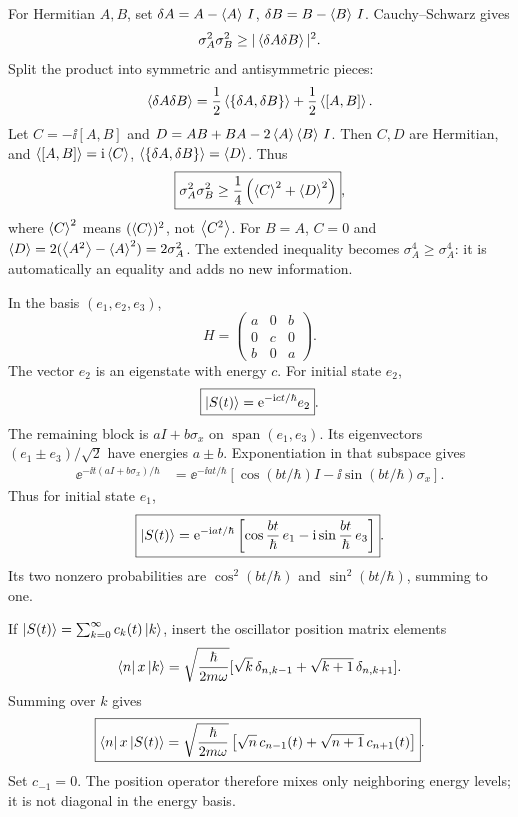 For Hermitian $A,B$, set
$\delta A=A-\left\langle A\right\rangle\,I$,
$\delta B=B-\left\langle B\right\rangle\,I$.
Cauchy--Schwarz gives
\begin{equation}
\sigma_A^2\sigma_B^2\ge
|\left\langle\delta A\delta B\right\rangle|^2.
\end{equation}
Split the product into symmetric
and antisymmetric pieces:
\begin{equation}
\left\langle\delta A\delta B\right\rangle=
\frac12\left\langle\{\delta A,\delta B\}\right\rangle+
\frac12\left\langle[A,B]\right\rangle.
\end{equation}
Let $C=-\ii[A,B]$ and
$D=AB+BA-2\left\langle A\right\rangle\left\langle B\right\rangle\,I$.
Then $C,D$ are Hermitian, and
$\left\langle[A,B]\right\rangle=\mathrm{i}\left\langle C\right\rangle$,
$\left\langle\{\delta A,\delta B\}\right\rangle=\left\langle D\right\rangle$.
Thus
\begin{equation}
\boxed{\sigma_A^2\sigma_B^2\ge
\frac14\left(\left\langle C\right\rangle^2+\left\langle D\right\rangle^2\right)},
\end{equation}
where $\left\langle C\right\rangle^2$ means
$(\left\langle C\right\rangle)^2$, not $\left\langle C^2\right\rangle$.
For $B=A$, $C=0$ and
$\left\langle D\right\rangle=2(\left\langle A^2\right\rangle-\left\langle A\right\rangle^2)=2\sigma_A^2$.
The extended inequality becomes
$\sigma_A^4\ge\sigma_A^4$:
it is automatically an equality and
adds no new information.

In the basis $(e_1,e_2,e_3)$,
\begin{equation}
H=\begin{pmatrix}a&0&b\\0&c&0\\b&0&a\end{pmatrix}.
\end{equation}
The vector $e_2$ is an eigenstate
with energy $c$. For initial state $e_2$,
\begin{equation}
\boxed{\left|S(t)\right\rangle=\mathrm{e}^{-\mathrm{i} ct/\hbar}e_2}.
\end{equation}
The remaining block is
$aI+b\sigma_x$ on $\operatorname{span}(e_1,e_3)$.
Its eigenvectors $(e_1\pm e_3)/\sqrt2$
have energies $a\pm b$.
Exponentiation in that subspace gives
\begin{align}
\ee^{-\ii t(aI+b\sigma_x)/\hbar}
&=\ee^{-\ii at/\hbar}
[\cos(bt/\hbar)I-\ii\sin(bt/\hbar)\sigma_x].
\end{align}
Thus for initial state $e_1$,
\begin{equation}
\boxed{\left|S(t)\right\rangle=\mathrm{e}^{-\mathrm{i} at/\hbar}
\left[\cos\frac{bt}{\hbar}\,e_1
-\mathrm{i}\sin\frac{bt}{\hbar}\,e_3\right]}.
\end{equation}
Its two nonzero probabilities are
$\cos^2(bt/\hbar)$ and $\sin^2(bt/\hbar)$,
summing to one.

If $\left|S(t)\right\rangle=\sum_{k=0}^\infty c_k(t)\left|k\right\rangle$,
insert the oscillator position matrix elements
\begin{equation}
\left\langle n\right| x\left|k\right\rangle=
\sqrt{\frac{\hbar}{2m\omega}}
[\sqrt{k}\,\delta_{n,k-1}
+\sqrt{k+1}\,\delta_{n,k+1}].
\end{equation}
Summing over $k$ gives
\begin{equation}
\boxed{\left\langle n\right| x\left|S(t)\right\rangle=
\sqrt{\frac{\hbar}{2m\omega}}
\left[\sqrt n\,c_{n-1}(t)
+\sqrt{n+1}\,c_{n+1}(t)\right]}.
\end{equation}
Set $c_{-1}=0$. The position operator
therefore mixes only neighboring energy levels;
it is not diagonal in the energy basis.

